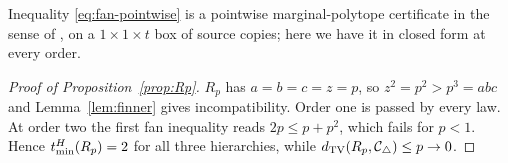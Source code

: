 Inequality \eqref{eq:fan-pointwise} is a pointwise marginal-polytope certificate in the sense of \cite{WSF2019}, on a $1\times1\times t$ box of source copies; here we have it in closed form at every order.

\begin{proof}[Proof of Proposition~\ref{prop:Rp}]
$R_p$ has $a=b=c=z=p$, so $z^2=p^2>p^3=abc$ and Lemma~\ref{lem:finner} gives incompatibility. Order one is passed by every law. At order two the first fan inequality reads $2p\le p+p^2$, which fails for $p<1$. Hence $t_{\min}^H(R_p)=2$ for all three hierarchies, while $d_{\operatorname{TV}}(R_p,\mathcal C_{\triangle})\le p\to0$.
\end{proof}
